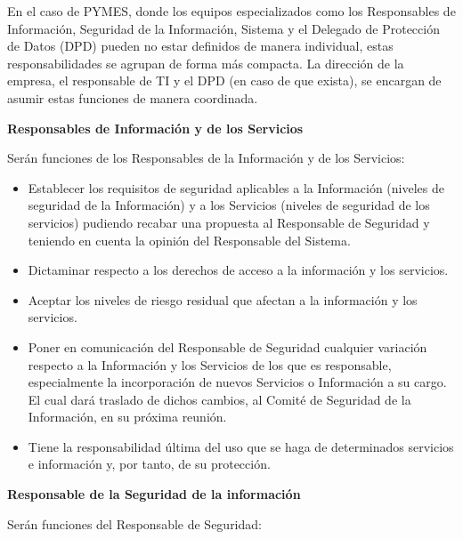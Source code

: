 \begin{enumerate}[label=\alph*)]
\vspace{1em}

En el caso de PYMES, donde los equipos especializados como los Responsables de Información, Seguridad de la Información, Sistema y el Delegado de Protección de Datos (DPD) pueden no estar definidos de manera individual, estas responsabilidades se agrupan de forma más compacta. La dirección de la empresa, el responsable de TI y el DPD (en caso de que exista), se encargan de asumir estas funciones de manera coordinada.

\textbf{Responsables de Información y de los Servicios}

Serán funciones de los Responsables de la Información y de los Servicios:

\begin{itemize}
  \item Establecer los requisitos de seguridad aplicables a la Información (niveles de seguridad de la Información) y a los Servicios (niveles de seguridad de los servicios) pudiendo recabar una propuesta al Responsable de Seguridad y teniendo en cuenta la opinión del Responsable del Sistema.
  \item Dictaminar respecto a los derechos de acceso a la información y los servicios.
  \item Aceptar los niveles de riesgo residual que afectan a la información y los servicios.
  \item Poner en comunicación del Responsable de Seguridad cualquier variación respecto a la Información y los Servicios de los que es responsable, especialmente la incorporación de nuevos Servicios o Información a su cargo. El cual dará traslado de dichos cambios, al Comité de Seguridad de la Información, en su próxima reunión.
  \item Tiene la responsabilidad última del uso que se haga de determinados servicios e información y, por tanto, de su protección.
\end{itemize}

\textbf{Responsable de la Seguridad de la información}

Serán funciones del Responsable de Seguridad:


\end{enumerate}
